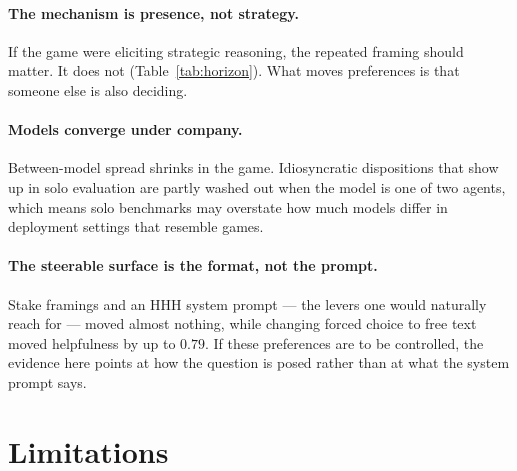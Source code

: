 \documentclass[11pt]{article}
\begin{document}
\paragraph{The mechanism is presence, not strategy.}
If the game were eliciting strategic reasoning, the repeated framing should
matter. It does not (Table~\ref{tab:horizon}). What moves preferences is that
someone else is also deciding.

\paragraph{Models converge under company.}
Between-model spread shrinks in the game. Idiosyncratic dispositions that show
up in solo evaluation are partly washed out when the model is one of two agents,
which means solo benchmarks may overstate how much models differ in deployment
settings that resemble games.

\paragraph{The steerable surface is the format, not the prompt.}
Stake framings and an HHH system prompt --- the levers one would naturally reach
for --- moved almost nothing, while changing forced choice to free text moved
helpfulness by up to $0.79$. If these preferences are to be controlled, the
evidence here points at how the question is posed rather than at what the system
prompt says.

\section{Limitations}
\label{sec:limits}
\end{document}
